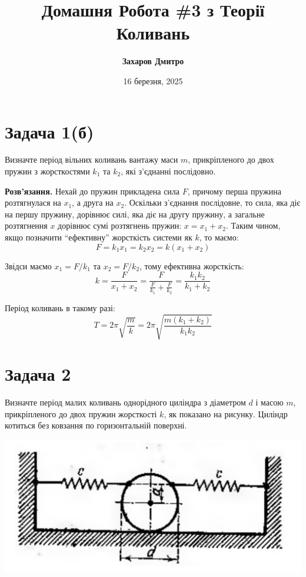 \documentclass{hw_template}
\title{\bfseries Домашня Робота \#3 з Теорії Коливань}
\author{\bfseries Захаров Дмитро}
\date{16 березня, 2025}
\begin{document}
\pagestyle{fancy}

\maketitle

\section{Задача 1(б)}


\begin{problem}
    Визначте період вільних коливань вантажу маси $m$, прикріпленого до двох пружин 
    з жорсткостями $k_1$ та $k_2$, які з'єднанні послідовно.
\end{problem}

\textbf{Розв'язання.} Нехай до пружин прикладена сила $F$, причому перша 
пружина розтягнулася на $x_1$, а друга на $x_2$. Оскільки з'єднання 
послідовне, то сила, яка діє на першу пружину, дорівнює силі, яка діє
на другу пружину, а загальне розтягнення $x$ дорівнює сумі розтягнень
пружин: $x = x_1 + x_2$. Таким чином, якщо позначити ``ефективну''
жорсткість системи як $k$, то маємо:
\begin{equation*}
    F = k_1x_1 = k_2x_2 = k(x_1+x_2)
\end{equation*}

Звідси маємо $x_1=F/k_1$ та $x_2=F/k_2$, тому ефективна жорсткість:
\begin{equation*}
    k = \frac{F}{x_1+x_2} = \frac{F}{\frac{F}{k_1} + \frac{F}{k_2}} = \frac{k_1k_2}{k_1+k_2}
\end{equation*}

Період коливань в такому разі:
\begin{equation*}
    T = 2\pi\sqrt{\frac{m}{k}} = 2\pi\sqrt{\frac{m(k_1+k_2)}{k_1k_2}}
\end{equation*}

\newpage

\section{Задача 2}

\begin{problem}
    Визначте період малих коливань однорідного циліндра з діаметром $d$ і масою
$m$, прикріпленого до двох пружин жорсткості $k$, як показано на рисунку.
Циліндр котиться без ковзання по горизонтальній поверхні.
\end{problem}

\begin{center}
    \includegraphics[width=0.5\linewidth]{images/hw_3_problem_3.png}
\end{center}
\end{document}
